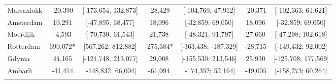 \begin{table}[ht]
\begin{adjustbox}{max width=\textwidth}
\begin{tabular}{lcccccc}
  Marsaxlokk &  -20,390 & [-173,654, 132,873] &  -28,429 & [-104,769; 47,912] & -20,371 & [-102,363; 61,621] \\ 
  Amsterdam &   10,291 & [-47,895, 68,477] &   18,096 & [-32,859; 69,050] &  18,096 & [-32,859; 69,050] \\ 
  Moerdijk &   -4,593 & [-70,730, 61,543] &   21,738 & [-48,321; 91,797] &  27,660 & [-47,298; 102,618] \\ 
  Rotterdam &  690,072* & [567,262, 812,882] & -275,384* & [-363,438; -187,329] & -28,715 & [-149,432; 92,002] \\ 
  Gdynia &   44,165 & [-124,748, 213,077] &   29,008 & [-155,530; 213,546] &  25,930 & [-125,708; 177,569] \\ 
  Ambarli &  -41,414 & [-148,832, 66,004] &  -61,094 & [-174,352; 52,164] & -49,005 & [-158,273; 60,264] \\ 
   [2ex] \hline \hline {}\end{tabular} 
 \end{adjustbox}
\endgroup
\end{table}

